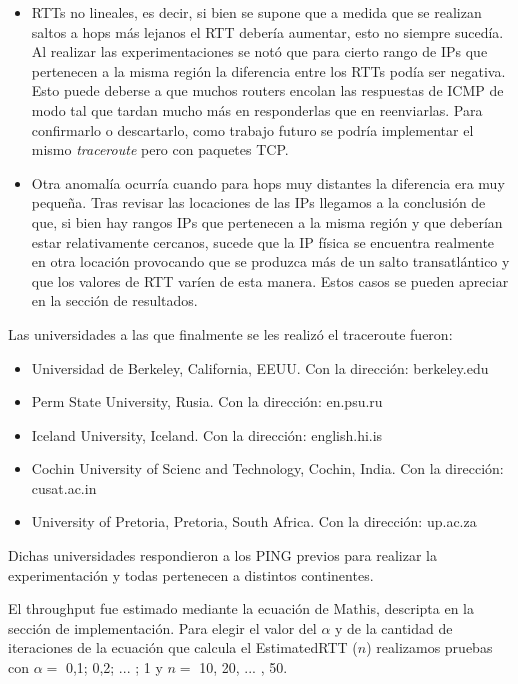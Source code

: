 \begin{itemize}
    \item RTTs no lineales, es decir, si bien se supone que a medida que se realizan saltos a hops más lejanos el RTT debería aumentar, esto no siempre sucedía. Al realizar las experimentaciones se notó que para cierto rango de IPs que pertenecen a la misma región la diferencia entre los RTTs podía ser negativa. Esto puede deberse a que muchos routers encolan las respuestas de ICMP de modo tal que tardan mucho más en responderlas que en reenviarlas. Para confirmarlo o descartarlo, como trabajo futuro se podría implementar el mismo \textit{traceroute} pero con paquetes TCP.
    
    \item Otra anomalía ocurría cuando para hops muy distantes la diferencia era muy pequeña. Tras revisar las locaciones de las IPs llegamos a la conclusión de que, si bien hay rangos IPs que pertenecen a la misma región y que deberían estar relativamente cercanos, sucede que la IP física se encuentra realmente en otra locación provocando que se produzca más de un salto transatlántico y que los valores de RTT varíen de esta manera. Estos casos se pueden apreciar en la sección de resultados.    

\end{itemize}

Las universidades a las que finalmente se les realizó el traceroute fueron:

\begin{itemize}
	\item Universidad de Berkeley, California, EEUU. Con la dirección: berkeley.edu
	\item Perm State University, Rusia. Con la dirección: en.psu.ru
	\item Iceland University, Iceland. Con la dirección: english.hi.is
	\item Cochin University of Scienc and Technology, Cochin, India. Con la dirección: cusat.ac.in
	\item University of Pretoria, Pretoria, South Africa. Con la dirección: up.ac.za 
\end{itemize}

Dichas universidades respondieron a los PING previos para realizar la experimentación y todas pertenecen a distintos continentes.

El throughput fue estimado mediante la ecuación de Mathis, descripta en la sección de implementación. Para elegir el valor del $\alpha$ y de la cantidad de iteraciones de la ecuación que calcula el EstimatedRTT ($n$) realizamos pruebas con $\alpha =$ 0,1; 0,2; ... ; 1 y $n =$ 10, 20, ... , 50.
